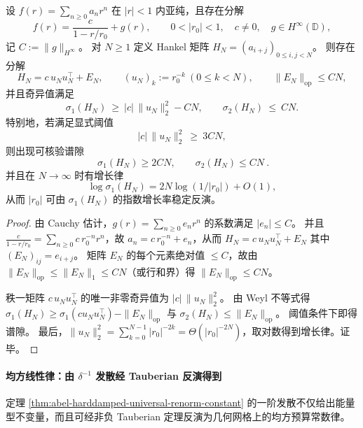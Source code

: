 \begin{theorem}\label{thm:abel-hankel-spectral-gap-single-pole}
设 \(f(r)=\sum_{n\ge 0}a_n r^n\) 在 \(|r|<1\) 内亚纯，且存在分解
\[
f(r)=\frac{c}{1-r/r_0}+g(r),
\qquad 0<|r_0|<1,\quad c\neq 0,\quad g\in H^\infty(\mathbb D),
\]
记 \(C:=\|g\|_{H^\infty}\)。
对 \(N\ge 1\) 定义 Hankel 矩阵 \(H_N=(a_{i+j})_{0\le i,j<N}\)。
则存在分解
\[
H_N=c\,u_Nu_N^{\top}+E_N,
\qquad (u_N)_k:=r_0^{-k}\ (0\le k<N),
\qquad \|E_N\|_{\mathrm{op}}\le C N,
\]
并且奇异值满足
\[
\sigma_1(H_N)\ \ge\ |c|\,\|u_N\|_2^2-CN,
\qquad
\sigma_2(H_N)\ \le\ CN.
\]
特别地，若满足显式阈值
\[
|c|\,\|u_N\|_2^2\ \ge\ 3CN,
\]
则出现可核验谱隙
\[
\boxed{\ \sigma_1(H_N)\ge 2CN,\qquad \sigma_2(H_N)\le CN\ }.
\]
并且在 \(N\to\infty\) 时有增长律
\[
\log \sigma_1(H_N)=2N\log(1/|r_0|)+O(1),
\]
从而 \(|r_0|\) 可由 \(\sigma_1(H_N)\) 的指数增长率稳定反演。
\end{theorem}
\begin{proof}
由 Cauchy 估计，\(g(r)=\sum_{n\ge 0}e_n r^n\) 的系数满足 \(|e_n|\le C\)。
并且 \(\frac{c}{1-r/r_0}=\sum_{n\ge 0}c\,r_0^{-n}r^n\)，故 \(a_n=c\,r_0^{-n}+e_n\)，从而
\(
H_N=c\,u_Nu_N^\top+E_N
\)
其中 \((E_N)_{ij}=e_{i+j}\)。
矩阵 \(E_N\) 的每个元素绝对值 \(\le C\)，故由 \(\|E_N\|_{\mathrm{op}}\le \|E_N\|_{1}\le CN\)（或行和界）得 \(\|E_N\|_{\mathrm{op}}\le CN\)。
\par
秩一矩阵 \(c\,u_Nu_N^\top\) 的唯一非零奇异值为 \(|c|\,\|u_N\|_2^2\)。
由 Weyl 不等式得
\(
\sigma_1(H_N)\ge \sigma_1(cu_Nu_N^\top)-\|E_N\|_{\mathrm{op}}
\)
与
\(
\sigma_2(H_N)\le \|E_N\|_{\mathrm{op}}
\)。
阈值条件下即得谱隙。
最后，\(\|u_N\|_2^2=\sum_{k=0}^{N-1}|r_0|^{-2k}=\Theta(|r_0|^{-2N})\)，取对数得到增长律。证毕。
\end{proof}




\paragraph{均方线性律：由 \texorpdfstring{$\delta^{-1}$}{δ^{-1}} 发散经 Tauberian 反演得到}
定理 \ref{thm:abel-harddamped-universal-renorm-constant} 的一阶发散不仅给出能量型不变量，而且可经非负 Tauberian 定理反演为几何网格上的均方预算常数律。

